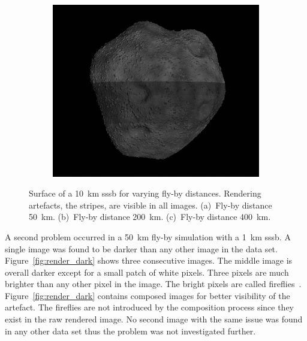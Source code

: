 \begin{figure}[htb]
\begin{subfigure}[b]{0.32\textwidth}
        \caption{}
        \label{fig:render_artefacts_200}
    \end{subfigure}
    \begin{subfigure}[b]{0.32\textwidth}
        \centering
        \includegraphics[width=\textwidth]{doc/thesis/0_figures/rendering_artefacts/400_10_SssbOnly_2017-08-15T115845-190000.jpg}
        \caption{}
        \label{fig:render_artefacts_400}
    \end{subfigure}
    \caption{Surface of a \SI{10}{\kilo\meter} \gls{sssb} for varying fly-by distances. Rendering artefacts, the stripes, are visible in all images. (a)~Fly-by distance \SI{50}{\kilo\meter}. (b)~Fly-by distance \SI{200}{\kilo\meter}. (c)~Fly-by distance \SI{400}{\kilo\meter}.}
    \label{fig:render_artefacts}
\end{figure}

A second problem occurred in a \SI{50}{\kilo\meter} fly-by simulation with a \SI{1}{\kilo\meter} \gls{sssb}. A single image was found to be darker than any other image in the data set. Figure~\ref{fig:render_dark} shows three consecutive images. The middle image is overall darker except for a small patch of white pixels. Three pixels are much brighter than any other pixel in the image. The bright pixels are called fireflies~\cite{Valenza2015BlenderCookbook}. Figure~\ref{fig:render_dark} contains composed images for better visibility of the artefact. The fireflies are not introduced by the composition process since they exist in the raw rendered image. No second image with the same issue was found in any other data set thus the problem was not investigated further.

